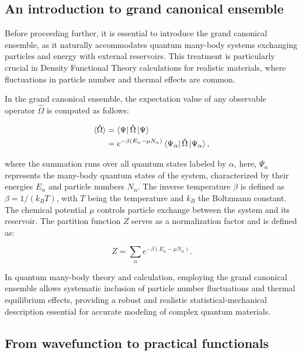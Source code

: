 \subsection{An introduction to grand canonical ensemble}

Before proceeding further, it is essential to introduce the grand canonical ensemble, as it naturally accommodates quantum many-body systems exchanging particles and energy with external reservoirs. This treatment is particularly crucial in Density Functional Theory calculations for realistic materials, where fluctuations in particle number and thermal effects are common.

In the grand canonical ensemble, the expectation value of any observable operator $\hat{\Omega}$ is computed as follows:

\begin{equation}
\begin{aligned}
    \braket{\hat{\Omega}} 
    &= \bra{\Psi}\hat\Omega\ket{\Psi} \\
    &= e^{-\beta(E_{\alpha}-\mu N_{\alpha})}\bra{\Psi_{\alpha}}\hat{\Omega}\ket{\Psi_{\alpha}},
\end{aligned}
\label{grand_canonical}
\end{equation}

where the summation runs over all quantum states labeled by $\alpha$, here, $\Psi_{\alpha}$ represents the many-body quantum states of the system, characterized by their energies $E_{\alpha}$ and particle numbers $N_{\alpha}$. The inverse temperature $\beta$ is defined as $\beta = 1/(k_B T)$, with $T$ being the temperature and $k_B$ the Boltzmann constant. The chemical potential $\mu$ controls particle exchange between the system and its reservoir. The partition function $Z$ serves as a normalization factor and is defined as:

\begin{equation}
    Z = \sum_{\alpha} e^{-\beta(E_{\alpha}-\mu N_{\alpha})}.
\label{partition_function}
\end{equation}

In quantum many-body theory and calculation, employing the grand canonical ensemble allows systematic inclusion of particle number fluctuations and thermal equilibrium effects, providing a robust and realistic statistical-mechanical description essential for accurate modeling of complex quantum materials.

\subsection{From wavefunction to practical functionals}

